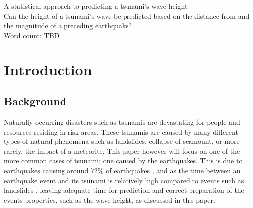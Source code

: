 \documentclass[11pt,letterpaper]{article}
\begin{document}
\doublespacing %



\begin{titlepage}
    \begin{center}
        \vspace*{4cm}
        A statistical approach to predicting a tsunami’s wave height \\
        \vspace{1cm}
        Can the height of a tsunami's wave be predicted based on the distance from and
        the magnitude of a preceding earthquake? \\
        \vspace{4cm}
        Word count: TBD
        \vfill
        \vspace{0.1cm}
    \end{center}
\end{titlepage}



\begin{center}
    \tableofcontents
    \vspace{1in}

\end{center}



\newpage


\section{Introduction}

\subsection{Background}

Naturally occurring disasters such as tsunamis are devastating for
people and resources residing in risk areas. These tsunamis are caused
by many different types of natural phenomena such as landslides, collapse of
seamount, or more rarely, the impact of a meteorite. This paper however will focus
on one of the more common cases of tsunami; one caused by the earthquakes. This
is due to earthquakes causing around 72\% of earthquakes \cite{pacifictsunamimuseum}, and as the time between an
earthquake event and its tsunami is relatively high compared to events such as landslides \cite{sue_nokes_walters},
leaving adequate time for prediction and correct preparation of the events properties, such as
the wave height, as discussed in this paper.
\end{document}
